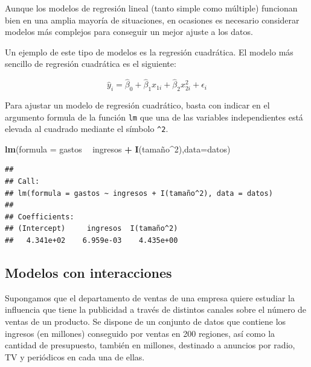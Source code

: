 \documentclass[]{book}
\newenvironment{Shaded}{\begin{snugshade}}{\end{snugshade}}
\newcommand{\KeywordTok}[1]{\textcolor[rgb]{0.13,0.29,0.53}{\textbf{#1}}}
\newcommand{\DataTypeTok}[1]{\textcolor[rgb]{0.13,0.29,0.53}{#1}}
\newcommand{\DecValTok}[1]{\textcolor[rgb]{0.00,0.00,0.81}{#1}}
\newcommand{\StringTok}[1]{\textcolor[rgb]{0.31,0.60,0.02}{#1}}
\newcommand{\OperatorTok}[1]{\textcolor[rgb]{0.81,0.36,0.00}{\textbf{#1}}}
\newcommand{\NormalTok}[1]{#1}
\begin{document}
Aunque los modelos de regresión lineal (tanto simple como múltiple)
funcionan bien en una amplia mayoría de situaciones, en ocasiones es
necesario considerar modelos más complejos para conseguir un mejor
ajuste a los datos.

Un ejemplo de este tipo de modelos es la regresión cuadrática. El modelo
más sencillo de regresión cuadrática es el siguiente:

\[
    \hat{y}_i  = \hat{\beta}_0 + \hat{\beta}_1 x_{1i} + \hat{\beta}_2 x_{2i}^2  + \epsilon_{i} 
\]

Para ajustar un modelo de regresión cuadrático, basta con indicar en el
argumento formula de la función \texttt{lm} que una de las variables
independientes está elevada al cuadrado mediante el símbolo
\texttt{\^{}2}.

\begin{Shaded}
\begin{Highlighting}[]
\KeywordTok{lm}\NormalTok{(}\DataTypeTok{formula =}\NormalTok{ gastos }\OperatorTok{~}\StringTok{ }\NormalTok{ingresos }\OperatorTok{+}\StringTok{ }\KeywordTok{I}\NormalTok{(tamaño}\OperatorTok{^}\DecValTok{2}\NormalTok{),}\DataTypeTok{data=}\NormalTok{datos)}
\end{Highlighting}
\end{Shaded}

\begin{verbatim}
## 
## Call:
## lm(formula = gastos ~ ingresos + I(tamaño^2), data = datos)
## 
## Coefficients:
## (Intercept)     ingresos  I(tamaño^2)  
##   4.341e+02    6.959e-03    4.435e+00
\end{verbatim}

\subsection{Modelos con interacciones}\label{modelos-con-interacciones}

Supongamos que el departamento de ventas de una empresa quiere estudiar
la influencia que tiene la publicidad a través de distintos canales
sobre el número de ventas de un producto. Se dispone de un conjunto de
datos que contiene los ingresos (en millones) conseguido por ventas en
200 regiones, así como la cantidad de presupuesto, también en millones,
destinado a anuncios por radio, TV y periódicos en cada una de ellas.
\end{document}
